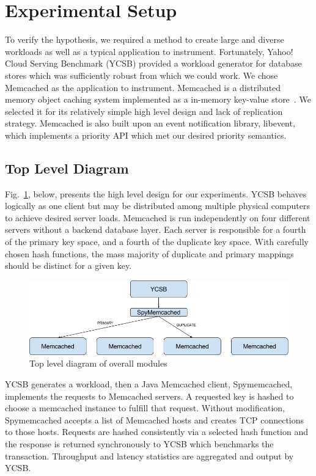 \documentclass[11pt,titlepage]{article}
\begin{document}
\section{Experimental Setup}

To verify the hypothesis, we required a method to create large and diverse
workloads as well as a typical application to instrument. Fortunately, Yahoo!
Cloud Serving Benchmark (YCSB) provided a workload generator for database stores
which was sufficiently robust from which we could work. We chose Memcached as
the application to instrument. Memcached is a distributed memory object caching
system implemented as a in-memory key-value store~\citep{memcached}. We selected
it for its relatively simple high level design and lack of replication strategy.
Memcached is also built upon an event notification library, libevent, which
implements a priority API which met our desired priority semantics.

\subsection{Top Level Diagram}\label{top_level_diagram}

Fig.~\ref{tld}, below, presents the high level design for our experiments. YCSB
behaves logically as one client but may be distributed among multiple physical
computers to achieve desired server loads. Memcached is run independently on
four different servers without a backend database layer. Each server is
responsible for a fourth of the primary key space, and a fourth of the duplicate
key space. With carefully chosen hash functions, the mass majority of duplicate
and primary mappings should be distinct for a given key.

\begin{figure}[h!]
  \centering
  \includegraphics[width=\textwidth]{tld.png}
  \caption[Top level diagram]{Top level diagram of overall modules}
  \label{tld}
\end{figure}

YCSB generates a workload, then a Java Memcached client, Spymemcached,
implements the requests to Memcached servers. A requested key is hashed to
choose a memcached instance to fulfill that request. Without modification,
Spymemcached accepts a list of Memcached hosts and creates TCP connections to
those hosts. Requests are hashed consistently via a selected hash function and
the response is returned synchronously to YCSB which benchmarks the transaction.
Throughput and latency statistics are aggregated and output by YCSB.
\end{document}
